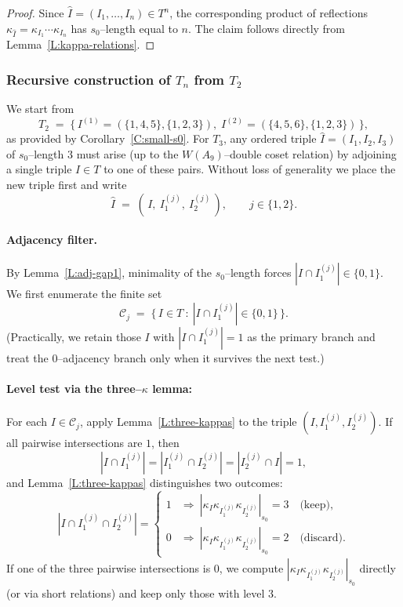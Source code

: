 \documentclass[11pt]{amsart}
\numberwithin{equation}{section}
\begin{document}
\begin{proof}
Since $\widehat I=(I_1,\dots,I_n)\in T^n$, the corresponding product of reflections
$\kappa_{\widehat I}=\kappa_{I_1}\cdots\kappa_{I_n}$ has $s_0$--length equal to $n$.
The claim follows directly from Lemma~\ref{L:kappa-relations}.
\end{proof}

\subsubsection{Recursive construction of $T_n$ from $T_2$}\label{SSS:recursive}

We start from
\[
T_2 \;=\; \bigl\{\, I^{(1)}=(\{1,4,5\},\{1,2,3\}),\;
                 I^{(2)}=(\{4,5,6\},\{1,2,3\}) \,\bigr\},
\]
as provided by Corollary~\ref{C:small-s0}. For $T_3$, any ordered triple
$\widehat I=(I_1,I_2,I_3)$ of $s_0$--length $3$ must arise (up to the
$W(A_9)$--double coset relation) by adjoining a single triple
$I\in T$ to one of these pairs. Without loss of generality we place the
new triple first and write
\[
\widehat I \;=\; (\, I,\ I^{(j)}_1,\ I^{(j)}_2 \,), \qquad j\in\{1,2\}.
\]

\paragraph{Adjacency filter.}
By Lemma~\ref{L:adj-gap1}, minimality of the $s_0$--length forces
$|I\cap I^{(j)}_1|\in\{0,1\}$.
We first enumerate the finite set
\[
\mathcal{C}_j \;=\; \{\, I\in T \ :\ |I\cap I^{(j)}_1|\in\{0,1\}\,\}.
\]
(Practically, we retain those $I$ with $|I\cap I^{(j)}_1|=1$ as the primary
branch and treat the $0$--adjacency branch only when it survives the next test.)

\paragraph{Level test via the three--$\kappa$ lemma:}
For each $I\in\mathcal{C}_j$, apply Lemma~\ref{L:three-kappas} to the triple
$(I, I^{(j)}_1, I^{(j)}_2)$.
If all pairwise intersections are $1$, then
\[
|I\cap I^{(j)}_1|=|I^{(j)}_1\cap I^{(j)}_2|=|I^{(j)}_2\cap I|=1,
\]
and Lemma~\ref{L:three-kappas} distinguishes two outcomes:
\[
|I\cap I^{(j)}_1\cap I^{(j)}_2|=
\begin{cases}
1 &\Rightarrow\ |\kappa_I\kappa_{I^{(j)}_1}\kappa_{I^{(j)}_2}|_{s_0}=3 \quad\text{(keep)},\\[4pt]
0 &\Rightarrow\ |\kappa_I\kappa_{I^{(j)}_1}\kappa_{I^{(j)}_2}|_{s_0}=2 \quad\text{(discard)}.
\end{cases}
\]
If one of the three pairwise intersections is $0$, we compute
$|\kappa_I\kappa_{I^{(j)}_1}\kappa_{I^{(j)}_2}|_{s_0}$ directly (or via
short relations) and keep only those with level $3$.
\end{document}
